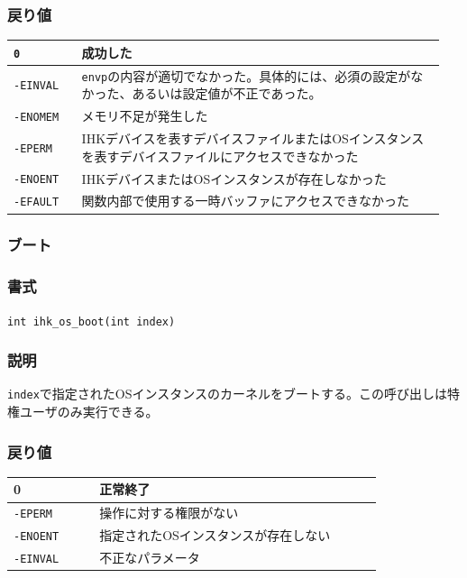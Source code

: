 \documentclass[twoside,11pt,fleqn]{book}
\begin{document}
\subsubsection*{戻り値}
\begin{table}[!h]
\footnotesize
\begin{tabular}{|p{0.15\linewidth}|p{0.80\linewidth}|} \hline
\verb:0:&	成功した\\ \hline
\verb:-EINVAL:&	\verb:envp:の内容が適切でなかった。具体的には、必須の設定がなかった、あるいは設定値が不正であった。\\ \hline
\verb:-ENOMEM:&	メモリ不足が発生した\\ \hline
\verb:-EPERM:&	IHKデバイスを表すデバイスファイルまたはOSインスタンスを表すデバイスファイルにアクセスできなかった\\ \hline
\verb:-ENOENT:&	IHKデバイスまたはOSインスタンスが存在しなかった\\ \hline
\verb:-EFAULT:&	関数内部で使用する一時バッファにアクセスできなかった\\ \hline
\end{tabular}
\vspace{-0em}
\end{table}
\FloatBarrier

\subsubsection{ブート}
\subsubsection*{書式}{\quad} \texttt{int ihk\_os\_boot(int index)}
\subsubsection*{説明}{\quad} \texttt{index}で指定されたOSインスタンスのカーネルをブートする。この呼び出しは特権ユーザのみ実行できる。

\subsubsection*{戻り値}
\begin{table}[!h]
\footnotesize
\begin{tabular}{|p{0.20\linewidth}|p{0.66\linewidth}|} \hline
0&正常終了\\ \hline
\texttt{-EPERM}&操作に対する権限がない\\ \hline
\texttt{-ENOENT}&指定されたOSインスタンスが存在しない\\ \hline
\texttt{-EINVAL}&不正なパラメータ\\ \hline
\end{tabular}
\vspace{-0em}
\end{table}
\FloatBarrier
\end{document}
